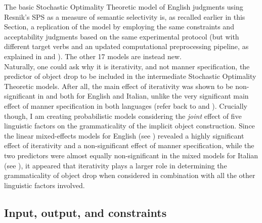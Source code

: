 The basic Stochastic Optimality Theoretic model of English judgments using Resnik's SPS as a measure of semantic selectivity is, as recalled earlier in this Section, a replication of the model by \textcite{Medina2007} employing the same constraints and acceptability judgments based on the same experimental protocol (but with different target verbs and an updated computational preprocessing pipeline, as explained in  and ). The other 17 models are instead new.\\
Naturally, one could ask why it is iterativity, and not manner specification, the predictor of object drop to be included in the intermediate Stochastic Optimality Theoretic models. After all, the main effect of iterativity was shown to be non-significant in  and  both for English and Italian, unlike the very significant main effect of manner specification in both languages (refer back to  and ). Crucially though, I am creating probabilistic models considering the \textit{joint} effect of five linguistic factors on the grammaticality of the implicit object construction. Since the linear mixed-effects models for English (see ) revealed a highly significant effect of iterativity and a non-significant effect of manner specification, while the two predictors were almost equally non-significant in the mixed models for Italian (see ), it appeared that iterativity plays a larger role in determining the grammaticality of object drop when considered in combination with all the other linguistic factors involved.


\subsection{Input, output, and constraints} 

